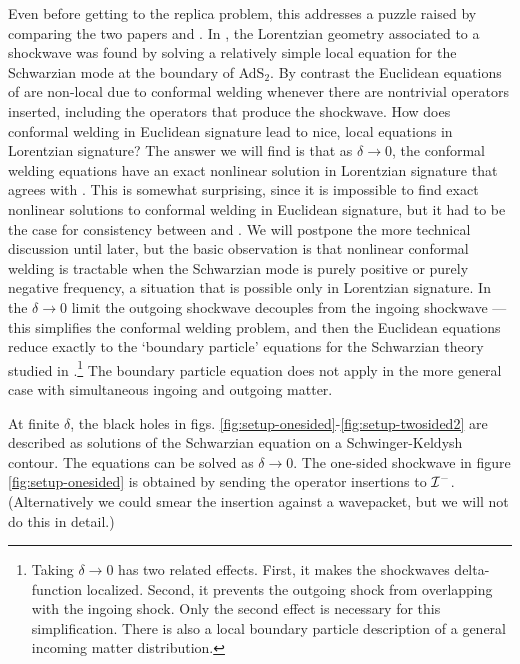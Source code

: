 \documentclass[11pt,oneside,letterpaper]{article}
\numberwithin{equation}{section}
\begin{document}
\begin{spacing}{1.1}
Even before getting to the replica problem, this addresses a puzzle raised by comparing the two papers \cite{Almheiri:2019psf} and \cite{Almheiri:2019qdq}. In \cite{Almheiri:2019psf}, the Lorentzian geometry associated to a shockwave was found by solving a relatively simple local equation for the Schwarzian mode \cite{Engelsoy:2016xyb} at the boundary of AdS$_2$. By contrast the Euclidean equations of \cite{Almheiri:2019qdq} are non-local due to conformal welding whenever there are nontrivial operators inserted, including the operators that produce the shockwave. How does conformal welding in Euclidean signature lead to nice, local equations in Lorentzian signature? The answer we will find is that as $\delta \to 0$, the conformal welding equations have an exact nonlinear solution in Lorentzian signature that agrees with \cite{Almheiri:2019psf}. This is somewhat surprising, since it is impossible to find exact nonlinear solutions to conformal welding in Euclidean signature, but it had to be the case for consistency between \cite{Almheiri:2019psf} and \cite{Almheiri:2019qdq}. We will postpone the more technical discussion until later, but the basic observation is that nonlinear conformal welding is tractable when the Schwarzian mode is purely positive or purely negative frequency, a situation that is possible only in Lorentzian signature. In the $\delta \to 0$ limit the outgoing shockwave decouples from the ingoing shockwave --- this simplifies the conformal welding problem, and then the Euclidean equations reduce exactly to the `boundary particle' equations for the Schwarzian theory studied in \cite{Maldacena:2016upp,Engelsoy:2016xyb,Almheiri:2019psf}.\footnote{Taking $\delta \to 0$ has two related effects. First, it makes the shockwaves delta-function localized. Second, it prevents the outgoing shock from overlapping with the ingoing shock. Only the second effect is necessary for this simplification. There is also a local boundary particle description of a general incoming matter distribution.} The boundary particle equation does not apply in the more general case with simultaneous ingoing and outgoing matter.

At finite $\delta$, the black holes in figs. \ref{fig:setup-onesided}-\ref{fig:setup-twosided2} are described as solutions of the Schwarzian equation on a Schwinger-Keldysh contour. The equations can be solved as $\delta \to 0$. The one-sided shockwave in figure \ref{fig:setup-onesided} is obtained by sending the operator insertions to ${\cal I}^-$. (Alternatively we could smear the insertion against a wavepacket, but we will not do this in detail.)




\end{spacing}
\end{document}
